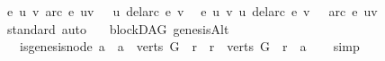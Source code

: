 \begin{isabellebody}
{\isachardoublequoteopen}{\isacharparenleft}{\kern0pt}{\isasymforall}e\ u\ v{\isachardot}{\kern0pt}\ arc\ e\ {\isacharparenleft}{\kern0pt}u{\isacharcomma}{\kern0pt}v{\isacharparenright}{\kern0pt}\ {\isasymlongrightarrow}\ {\isasymnot}\ {\isacharparenleft}{\kern0pt}u\ {\isasymrightarrow}\isactrlsup {\isacharplus}{\kern0pt}\isactrlbsub {\isacharparenleft}{\kern0pt}del{\isacharunderscore}{\kern0pt}arc\ e{\isacharparenright}{\kern0pt}\isactrlesub \ v{\isacharparenright}{\kern0pt}{\isacharparenright}{\kern0pt}\ \isanewline
{\isasymlongleftrightarrow}\ {\isacharparenleft}{\kern0pt}{\isasymforall}e\ u\ v{\isachardot}{\kern0pt}\ {\isacharparenleft}{\kern0pt}u\ {\isasymrightarrow}\isactrlsup {\isacharplus}{\kern0pt}\isactrlbsub {\isacharparenleft}{\kern0pt}del{\isacharunderscore}{\kern0pt}arc\ e{\isacharparenright}{\kern0pt}\isactrlesub \ v{\isacharparenright}{\kern0pt}\ {\isasymlongrightarrow}\ {\isasymnot}\ arc\ e\ {\isacharparenleft}{\kern0pt}u{\isacharcomma}{\kern0pt}v{\isacharparenright}{\kern0pt}{\isacharparenright}{\kern0pt}{\isachardoublequoteclose}\ \isanewline
%
\isadelimproof
%
\endisadelimproof
%
\isatagproof
{}\isamarkupfalse%
{\isacharparenleft}{\kern0pt}standard{\isacharcomma}{\kern0pt}\ auto{\isacharparenright}{\kern0pt}\ \isamarkupfalse%
%
\endisatagproof
{\isafoldproof}%
%
\isadelimproof
%
\endisadelimproof
%
\isadelimdocument
%
\endisadelimdocument
%
\isatagdocument
%
\isamarkuptrue%
%
\endisatagdocument
{\isafolddocument}%
%
\isadelimdocument
%
\endisadelimdocument
{}\isamarkupfalse%
\ {\isacharparenleft}{\kern0pt}\ blockDAG{\isacharparenright}{\kern0pt}\ genesisAlt\ {\isacharcolon}{\kern0pt}\isanewline
\ \ {\isachardoublequoteopen}{\isacharparenleft}{\kern0pt}is{\isacharunderscore}{\kern0pt}genesis{\isacharunderscore}{\kern0pt}node\ a{\isacharparenright}{\kern0pt}\ {\isasymlongleftrightarrow}\ {\isacharparenleft}{\kern0pt}{\isacharparenleft}{\kern0pt}a\ {\isasymin}\ verts\ G{\isacharparenright}{\kern0pt}\ {\isasymand}\ {\isacharparenleft}{\kern0pt}{\isasymforall}r{\isachardot}{\kern0pt}\ \ {\isacharparenleft}{\kern0pt}r\ {\isasymin}\ verts\ G{\isacharparenright}{\kern0pt}\ {\isasymlongrightarrow}\ r\ {\isasymrightarrow}\isactrlsup {\isacharasterisk}{\kern0pt}\ a{\isacharparenright}{\kern0pt}{\isacharparenright}{\kern0pt}{\isachardoublequoteclose}\isanewline
%
\isadelimproof
\ \ %
\endisadelimproof
%
\isatagproof
{}\isamarkupfalse%
\ simp%
\endisatagproof
{\isafoldproof}%
%
\isadelimproof
\isanewline
%
\endisadelimproof
\isanewline
{}\isamarkupfalse%

\end{isabellebody}
